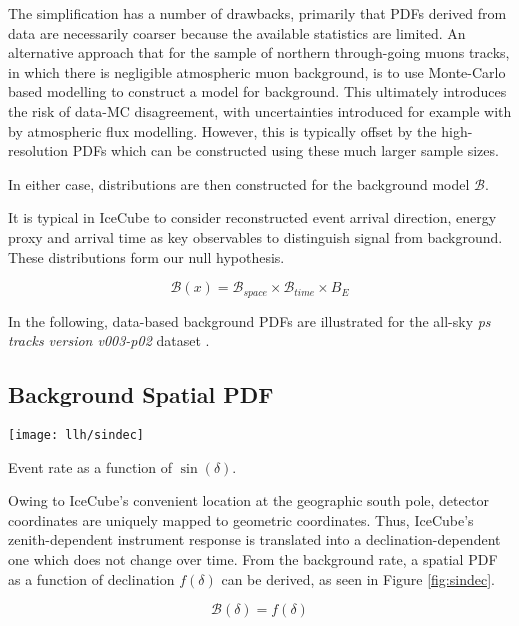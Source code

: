 The simplification has a number of drawbacks, primarily that PDFs derived from data are necessarily coarser because the available statistics are limited. An alternative approach that for the sample of northern through-going muons tracks, in which there is negligible atmospheric muon background, is to use Monte-Carlo based modelling to construct a model for background. This ultimately introduces the risk of data-MC disagreement,  with uncertainties introduced for example with by atmospheric flux modelling. However, this is typically offset by the high-resolution PDFs which can be constructed using these much larger sample sizes.

In either case, distributions are then constructed for the background model $\mathcal{B}$. 

It is typical in IceCube to consider reconstructed event arrival direction, energy proxy and arrival time as key observables to distinguish signal from background. These distributions form our null hypothesis. 

\begin{equation}
\mathcal{B} (x) = \mathcal{B}_{space} \times \mathcal{B}_{time}  \times {B}_{E}
\end{equation}

In the following, data-based background PDFs are illustrated for the all-sky \emph{ps tracks version v003-p02} dataset .

\subsection{Background Spatial PDF}

\begin{marginfigure}
	\centering \texttt{[image: llh/sindec]}
	\caption{Event rate as a function of $\sin(\delta)$.}
	\label{fig:sindec}
\end{marginfigure}

Owing to IceCube's convenient location at the geographic south pole, detector coordinates are uniquely mapped to geometric coordinates. Thus, IceCube's zenith-dependent instrument response is translated into a declination-dependent one which does not change over time. From the background rate, a spatial PDF as a function of declination $ f(\delta)$ can be derived, as seen in Figure \ref{fig:sindec}.

\begin{equation}
	\mathcal{B} (\delta) = f(\delta)
\end{equation}

